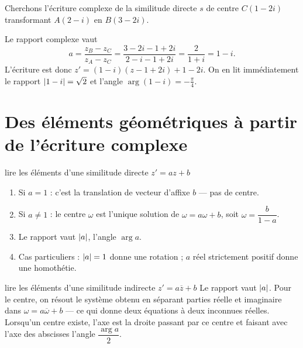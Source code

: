 \begin{exemple}
Cherchons l'écriture complexe de la similitude directe $s$ de centre
$C(1-2i)$ transformant $A(2-i)$ en $B(3-2i)$.

Le rapport complexe vaut
\[
  a = \frac{z_{B}-z_{C}}{z_{A}-z_{C}}
    = \frac{3-2i-1+2i}{2-i-1+2i}
    = \frac{2}{1+i}
    = 1-i .
\]
L'écriture est donc $z' = (1-i)\left(z-1+2i\right)+1-2i$. On en lit
immédiatement le rapport $\left|1-i\right| = \sqrt2$ et l'angle
$\arg(1-i) = -\frac{\pi}{4}$.
\end{exemple}

\section{Des éléments géométriques à partir de l'écriture complexe}

\begin{methode}{lire les éléments d'une similitude directe $z' = az+b$}
\begin{enumerate}[label=\textbf{\arabic*.}, leftmargin=*, itemsep=0.15em]
  \item Si $a = 1$ : c'est la translation de vecteur d'affixe $b$ — pas de
        centre.
  \item Si $a \neq 1$ : le centre $\omega$ est l'unique solution de
        $\omega = a\omega+b$, soit $\omega = \dfrac{b}{1-a}$.
  \item Le rapport vaut $\left|a\right|$, l'angle $\arg a$.
  \item Cas particuliers : $\left|a\right| = 1$ donne une rotation ; $a$ réel
        strictement positif donne une homothétie.
\end{enumerate}
\end{methode}

\begin{methode}{lire les éléments d'une similitude indirecte $z' = a\overline z+b$}
Le rapport vaut $\left|a\right|$. Pour le centre, on résout le système obtenu en
séparant parties réelle et imaginaire dans $\omega = a\overline\omega+b$ — ce
qui donne deux équations à deux inconnues réelles. Lorsqu'un centre existe,
l'axe est la droite passant par ce centre et faisant avec l'axe des abscisses
l'angle $\dfrac{\arg a}{2}$.
\end{methode}

